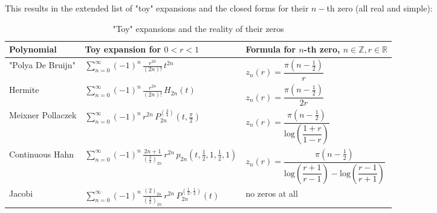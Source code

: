 \documentclass[a4paper,11pt,twoside]{amsart}
\newcommand{\verifiedeq}{=}
\newcommand{\verifiedeq}{\stackrel{\checkmark}{=}}
\begin{document}
\begin{itemize}
This results in the extended list of "toy" expansions and the closed forms for their $n-$th zero (all real and simple):
\begin{table}[H]
  \begin{center}
    \caption{"Toy" expansions and the reality of their zeros}
    \label{tab:tablezeros}
    \begin{tabular}{l|l|l|} 
      Polynomial & Toy expansion for $0 < r < 1$ & Formula for  $n$-th zero, $ n \in \mathbb{Z}, r \in \mathbb{R}$\\
      \hline
      "Polya De Bruijn" & $\displaystyle \sum_{n=0}^\infty (-1)^n\, \frac{ r^{2n}}{(2n)!}\,t^{2n}$  &$\displaystyle z_n(r) \verifiedeq \dfrac{\pi  \left(n-\frac12\right)}{r}$ \\       
      Hermite & $\displaystyle \sum_{n=0}^\infty (-1)^n\, \frac{ r^{2n}}{(2n)!}\, H_{2n}\left(t\right)$  &$\displaystyle z_n(r) \verifiedeq \dfrac{\pi  \left(n-\frac12\right)}{2r}$ \\
      Meixner Pollaczek & $\displaystyle \sum_{n=0}^\infty (-1)^n\, r^{2n}\, P_{2n}^{\left(\frac34\right)}\left(t, \frac{\pi}{2}\right)$ &  $\displaystyle z_n(r) \verifiedeq \dfrac{\pi  \left(n-\frac12\right)}{\mathrm{log}\! \left(\dfrac{1+r}{1-r}\right)}$\\
      Continuous Hahn & $\displaystyle \sum_{n=0}^\infty (-1)^n\, \frac{2n+1}{\left(\frac32\right)_{2n}}\,r^{2n}\,p_{2n}\left(t,\frac12,1,\frac12,1\right)$  & $\displaystyle z_n(r) \verifiedeq \dfrac{\pi  \left(n-\frac12\right)}{\mathrm{log}\! \left(\dfrac{r +1}{r-1}\right)-\mathrm{log}\! \left(\dfrac{r-1}{r+1}\right)}$\\
     Jacobi & $\displaystyle \sum_{n=0}^\infty (-1)^n\, \frac{(2)_{2n}}{\left(\frac32\right)_{2n}}\,r^{2n}\,P_{2n}^{\left(\frac12,\frac12\right)}(t)$  & no zeros at all\\
    \end{tabular}
  \end{center}
\end{table}

\pagebreak
\end{itemize}
\end{document}
